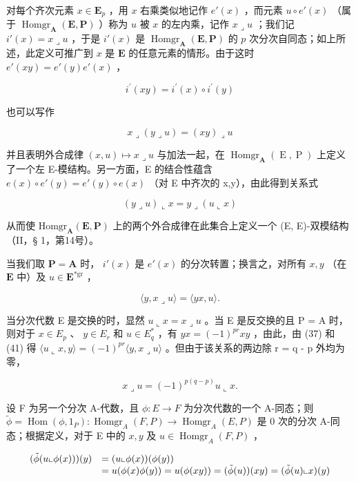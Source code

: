 对每个齐次元素 \(x \in \mathbf{E}_p\) ，用 \(x\) 右乘类似地记作 \(e'(x)\) ，而元素 \(u \circ e'(x)\) （属于 \(\operatorname{Homgr}_{\mathbf{A}}(\mathbf{E}, \mathbf{P})\) ）称为 \(u\) 被 \(x\) 的左内乘，记作 \(x \lrcorner u\) ；我们记 \(i'(x) = x \lrcorner u\) ，于是 \(i'(x)\) 是 \(\operatorname{Homgr}_{\mathbf{A}}(\mathbf{E}, \mathbf{P})\) 的 \(p\) 次分次自同态；如上所述，此定义可推广到 \(x\) 是 \(\mathbf{E}\) 的任意元素的情形。由于这时 \(e'(xy) = e'(y)e'(x)\) ，

\[
i ^ {\prime} (x y) = i ^ {\prime} (x) \circ i ^ {\prime} (y)\tag{38}
\]

也可以写作

\[
x \lrcorner (y \lrcorner u) = (x y) \lrcorner u\tag{39}
\]

并且表明外合成律 \((x,u)\mapsto x\lrcorner u\) 与加法一起，在 \(\operatorname{Homgr}_{\mathbf{A}}(\operatorname{E},\operatorname{P})\) 上定义了一个左 E-模结构。另一方面，E 的结合性蕴含 \(e(x)\circ e'(y)=e'(y)\circ e(x)\) （对 E 中齐次的 x,y），由此得到关系式

\[
(y \lrcorner u) \llcorner x = y \lrcorner (u \llcorner x)\tag{40}
\]

从而使 \(\mathrm{Homgr}_{\mathbf{A}}(\mathbf{E},\mathbf{P})\) 上的两个外合成律在此集合上定义一个 (E, E)-双模结构（II，§ 1，第14号）。

当我们取 \(\mathbf{P} = \mathbf{A}\) 时， \(i'(x)\) 是 \(e'(x)\) 的分次转置；换言之，对所有 \(x, y\) （在 \(\mathbf{E}\) 中）及 \(u \in \mathbf{E}^{*\mathrm{gr}}\) ，

\[
\langle y, x \lrcorner u \rangle = \langle y x, u \rangle .\tag{41}
\]

当分次代数 E 是交换的时，显然 \(u \llcorner x = x \lrcorner u\) 。当 E 是反交换的且 P = A 时，则对于 \(x \in E_{p}\) 、 \(y \in E_{r}\) 和 \(u \in E_{q}^{*}\) ，有 \(yx = (-1)^{pr}xy\) ，由此，由 (37) 和 (41) 得 \(\langle u \llcorner x, y \rangle = (-1)^{pr}\langle y, x \lrcorner u \rangle\) 。但由于该关系的两边除 r = q - p 外均为零，

\[
x \lrcorner u = (- 1) ^ {p (q - p)} u \llcorner x.
\]

设 F 为另一个分次 A-代数，且 \(\phi: E \to F\) 为分次代数的一个 A-同态；则 \(\tilde{\phi} = \operatorname{Hom}(\phi, 1_{P}): \operatorname{Homgr}_{A}(F, P) \to \operatorname{Homgr}_{A}(E, P)\) 是 0 次的分次 A-同态；根据定义，对于 E 中的 \(x, y\) 及 \(u \in \operatorname{Homgr}_{A}(F, P)\) ，

\[
\begin{array}{r l} (\tilde {\phi} (u \llcorner \phi (x))) (y) & = (u \llcorner \phi (x)) (\phi (y)) \\ & = u (\phi (x) \phi (y)) = u (\phi (x y)) = (\tilde {\phi} (u)) (x y) = (\tilde {\phi} (u) \llcorner x) (y) \end{array}
\]

